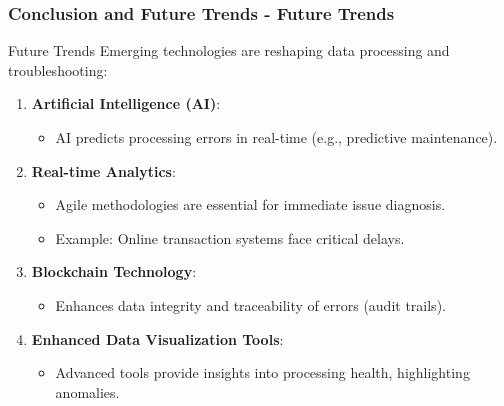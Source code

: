 \documentclass[aspectratio=169]{beamer}
\begin{document}
\begin{frame}[fragile]
    \frametitle{Conclusion and Future Trends - Future Trends}
    \begin{block}{Future Trends}
        Emerging technologies are reshaping data processing and troubleshooting:
    \end{block}
    \begin{enumerate}
        \item \textbf{Artificial Intelligence (AI)}:
        \begin{itemize}
            \item AI predicts processing errors in real-time (e.g., predictive maintenance).
        \end{itemize}
        \item \textbf{Real-time Analytics}:
        \begin{itemize}
            \item Agile methodologies are essential for immediate issue diagnosis.
            \item Example: Online transaction systems face critical delays.
        \end{itemize}
        \item \textbf{Blockchain Technology}:
        \begin{itemize}
            \item Enhances data integrity and traceability of errors (audit trails).
        \end{itemize}
        \item \textbf{Enhanced Data Visualization Tools}:
        \begin{itemize}
            \item Advanced tools provide insights into processing health, highlighting anomalies.
        \end{itemize}
    \end{enumerate}
\end{frame}
\end{document}
